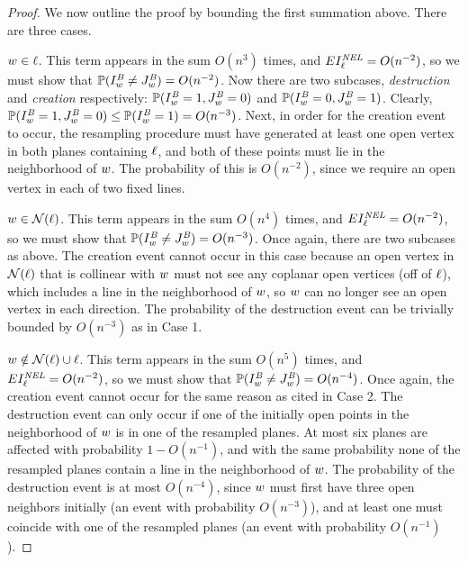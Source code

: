 \begin{proof}
We now outline the proof by bounding the first summation above.  There are three cases.

 ${ w}\in \ell$.  This term appears in the sum $O(n^3)$ times, and $EI^{\text{\em NEL}}_\ell = O(n^{-2})$, so we must show that $\mathbb{P}{(I^{\text{\em B}}_{{ w}} \neq J^{\text{\em B}}_{{ w}})} = O(n^{-2})$.  Now there are two subcases, {\em destruction} and {\em creation} respectively: $\mathbb{P}{(I^{\text{\em B}}_{{ w}} = 1, J^{\text{\em B}}_{{ w}} = 0)}$ and $\mathbb{P}{(I^{\text{\em B}}_{{ w}} = 0, J^{\text{\em B}}_{{ w}} = 1)}$.  Clearly, $\mathbb{P}{(I^{\text{\em B}}_{{ w}} = 1, J^{\text{\em B}}_{{ w}} = 0)}\leq \mathbb{P}{(I^{\text{\em B}}_{{ w}} = 1)} = O(n^{-3})$.  Next, in order for the creation event to occur, the resampling procedure must have generated at least one open vertex in both planes containing $\ell$, and both of these points must lie in the neighborhood of ${ w}$.  The probability of this is $O(n^{-2})$, since we require an open vertex in each of two fixed lines.

 ${ w} \in \mathcal{N}(\ell)$.  This term appears in the sum $O(n^4)$ times, and $EI^{\text{\em NEL}}_\ell = O(n^{-2})$, so we must show that $\mathbb{P}{(I^{\text{\em B}}_{{ w}} \neq J^{\text{\em B}}_{{ w}})} = O(n^{-3})$.  Once again, there are two subcases as above.  The creation event cannot occur in this case because an open vertex in $\mathcal{N}(\ell)$ that is collinear with ${ w}$ must not see any coplanar open vertices (off of $\ell$), which includes a line in the neighborhood of ${ w}$, so ${ w}$ can no longer see an open vertex in each direction.  The probability of the destruction event can be trivially bounded by $O(n^{-3})$ as in Case 1.

 ${ w} \notin \mathcal{N}(\ell) \cup \ell$.  This term appears in the sum $O(n^5)$ times, and $EI^{\text{\em NEL}}_\ell = O(n^{-2})$, so we must show that $\mathbb{P}{(I^{\text{\em B}}_{{ w}} \neq J^{\text{\em B}}_{{ w}})} = O(n^{-4})$.  Once again, the creation event cannot occur for the same reason as cited in Case 2.  The destruction event can only occur if one of the initially open points in the neighborhood of ${ w}$ is in one of the resampled planes.  At most six planes are affected with probability $1-O(n^{-1})$, and with the same probability none of the resampled planes contain a line in the neighborhood of ${ w}$.  The probability of the destruction event is at most $O(n^{-4})$, since ${ w}$ must first have three open neighbors initially (an event with probability $O(n^{-3})$), and at least one must coincide with one of the resampled planes (an event with probability $O(n^{-1})$).  
\end{proof}


